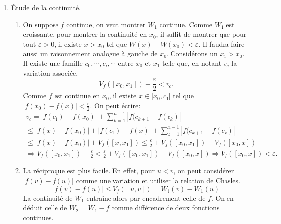 \begin{enumerate}
  \item \'Etude de la continuité.
\begin{enumerate}
  \item On suppose $f$ continue, on veut montrer $W_1$ continue. Comme $W_1$ est croissante, pour montrer la continuité en $x_0$, il suffit de montrer que pour tout $\varepsilon >0$, il existe $x>x_0$ tel que $W(x) - W(x_0) < \varepsilon$. Il faudra faire aussi un raisonnement analogue à gauche de $x_0$.\newline
Considérons un $x_1>x_0$. Il existe une famille $c_0, \cdots,c_i, \cdots $ entre $x_0$ et $x_1$ telle que, en notant $v_c$ la variation associée,
\begin{displaymath}
  V_f([x_0,x_1]) - \frac{\varepsilon}{2} < v_c .
\end{displaymath}
Comme $f$ est continue en $x_0$, il existe $x \in ]x_0 , c_1[$ tel que $|f(x_0)-f(x)|< \frac{\varepsilon}{2}$. On peut écrire:
\begin{multline*}
v_c = |f(c_1)-f(x_0)| + \sum_{k=1}^{n-1}|f(c_{k+1}-f(c_k)|\\
\leq |f(x)-f(x_0)| + |f(c_1)-f(x)| + \sum_{k=1}^{n-1}|f(c_{k+1}-f(c_k)|\\
\leq |f(x)-f(x_0)| + V_f([x,x_1]) \leq \frac{\varepsilon}{2} + V_f([x_0,x_1]) - V_f([x_0,x]) \\
\Rightarrow 
V_f([x_0,x_1]) - \frac{\varepsilon}{2} < \frac{\varepsilon}{2} + V_f([x_0,x_1]) - V_f([x_0,x]) 
\Rightarrow V_f([x_0,x]) < \varepsilon.
\end{multline*}

  \item La réciproque est plus facile. En effet, pour $u < v$, on peut considérer $|f(v) - f(u)|$ comme une variation et utiliser la relation de Chasles.
\begin{displaymath}
  |f(v) - f(u)| \leq V_f([u,v]) = W_1(v) - W_1(u)
\end{displaymath}
La continuité de $W_1$ entraîne alors par encadrement celle de $f$. On en déduit celle de $W_2 = W_1 - f$ comme différence de deux fonctions continues.
\end{enumerate}

\end{enumerate}
